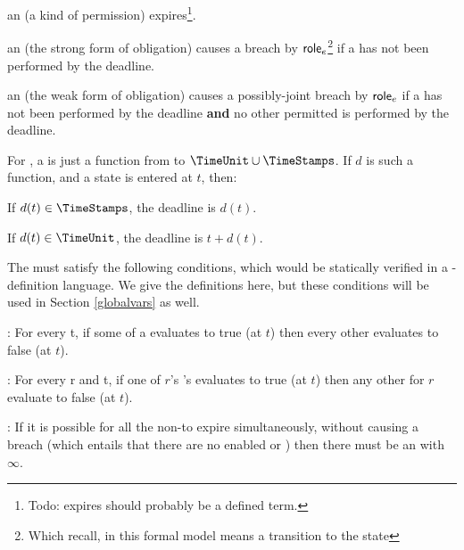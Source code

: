\documentclass[12pt]{article}
\begin{document}
\begin{LPPI}
	\item an \enabled \mayntran (a kind of permission) expires\footnote{Todo: expires should probably be a defined term.}.
	\item an \enabled \mustntran (the strong form of obligation) causes a breach by $\textsf{role}_{e}$\footnote{Which recall, in this formal model means a transition to the state \breached{\{\role{\eva}\}}} if a \compatible \Event has not been performed by the deadline. 
	\item an \enabled \rmustntran (the weak form of obligation) causes a possibly-joint breach by $\textsf{role}_{e}$ if a \compatible \Event has not been performed by the deadline {\bf and} no other permitted \Event is performed by the deadline. 
	\end{LPPI}
For \FSContracts, a \DeadlineFn is just a function from \TimeStamps to $\TimeUnit \cup \TimeStamps$. If $d$ is such a function, and a state is entered at \TimeStamp $t$, then:
\begin{LPPI}
\item If $d(t) \in \TimeStamps$, the deadline is $d(t)$.
	\item If $d(t) \in \TimeUnit$, the deadline is $t + d(t)$.
\end{LPPI}

The \TGuards must satisfy the following conditions, which would be statically verified in a \Contract-definition language. We give the \FSContracts definitions here, but these conditions will be used in Section \ref{globalvars} as well.
\medskip

\noindent {}: For every \TimeStamp t, if some \TGuard of a \mustntran evaluates to true (at $t$) then every other \TGuard evaluates to false (at $t$). 
\medskip

\noindent {}: For every \Role r and \TimeStamp t, if one of $r$'s \rmustntrans's \TGuards evaluates to true (at $t$) then any other \rmustntrans for $r$ evaluate to false (at $t$).
\medskip

\noindent {}: If it is possible for all the \enabled non-\Env \transitions to expire simultaneously, without causing a breach (which entails that there are no enabled \mustntrans or \rmustntrans) then there must be an \depTrans{\Env} with \Deadline $\infty$.
\smallskip



%
\end{document}
